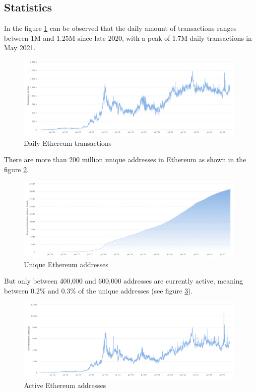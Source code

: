 \documentclass[MSE,Master,english]{twbook}%
\begin{document}
\subsection{Statistics}

In the figure \ref{fig:dailyTxs} can be observed that the daily amount of transactions ranges between 1M and 1.25M since late 2020, with a peak of 1.7M daily transactions in May 2021.
\begin{figure}[H]
  \centering
  \includegraphics[width=\textwidth]{daily_txs.png}
  \caption{Daily Ethereum transactions \cite{etherscanStats}}
  \label{fig:dailyTxs}
\end{figure}

There are more than 200 million unique addresses in Ethereum as shown in the figure \ref{fig:uniqueAddr}.
\begin{figure}[H]
  \centering
  \includegraphics[width=\textwidth]{unique_addresses.png}
  \caption{Unique Ethereum addresses \cite{etherscanStats}}
  \label{fig:uniqueAddr}
\end{figure}

But only between 400,000 and 600,000 addresses are currently active, meaning between 0.2\% and 0.3\% of the unique addresses (see figure \ref{fig:activeAddr}).
\begin{figure}[H]
  \centering
  \includegraphics[width=\textwidth]{active_addresses.png}
  \caption{Active Ethereum addresses \cite{etherscanStats}}
  \label{fig:activeAddr}
\end{figure}
\end{document}
